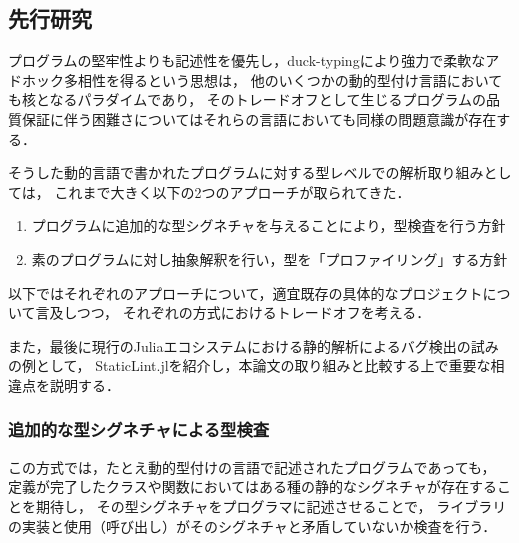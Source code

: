 \subsection{先行研究} \label{subsection:prev-reseaches}


プログラムの堅牢性よりも記述性を優先し，duck-typingにより強力で柔軟なアドホック多相性を得るという思想は，
他のいくつかの動的型付け言語においても核となるパラダイムであり，
そのトレードオフとして生じるプログラムの品質保証に伴う困難さについてはそれらの言語においても同様の問題意識が存在する．

そうした動的言語で書かれたプログラムに対する型レベルでの解析取り組みとしては，
これまで大きく以下の2つのアプローチが取られてきた．

\begin{enumerate}
  \item プログラムに追加的な型シグネチャを与えることにより，型検査を行う方針
  \item 素のプログラムに対し抽象解釈を行い，型を「プロファイリング」する方針
\end{enumerate}

以下ではそれぞれのアプローチについて，適宜既存の具体的なプロジェクトについて言及しつつ，
それぞれの方式におけるトレードオフを考える．

また，最後に現行のJuliaエコシステムにおける静的解析によるバグ検出の試みの例として，
StaticLint.jlを紹介し，本論文の取り組みと比較する上で重要な相違点を説明する．

\subsubsection{追加的な型シグネチャによる型検査} \label{subsubsection:type-check-with-annotation}


この方式では，たとえ動的型付けの言語で記述されたプログラムであっても，
定義が完了したクラスや関数においてはある種の静的なシグネチャが存在することを期待し，
その型シグネチャをプログラマに記述させることで，
ライブラリの実装と使用（呼び出し）がそのシグネチャと矛盾していないか検査を行う\cite{ruby-progress-report}．

